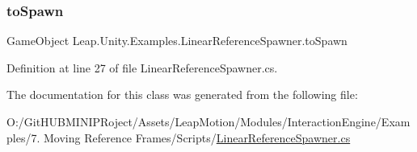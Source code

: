 \subsubsection{\texorpdfstring{toSpawn}{toSpawn}}
{\footnotesize\ttfamily Game\+Object Leap.\+Unity.\+Examples.\+Linear\+Reference\+Spawner.\+to\+Spawn}



Definition at line 27 of file Linear\+Reference\+Spawner.\+cs.



The documentation for this class was generated from the following file\+:\begin{DoxyCompactItemize}
\item 
O\+:/\+Git\+H\+U\+B\+M\+I\+N\+I\+P\+Roject/\+Assets/\+Leap\+Motion/\+Modules/\+Interaction\+Engine/\+Examples/7. Moving Reference Frames/\+Scripts/\mbox{\hyperlink{_linear_reference_spawner_8cs}{Linear\+Reference\+Spawner.\+cs}}\end{DoxyCompactItemize}

